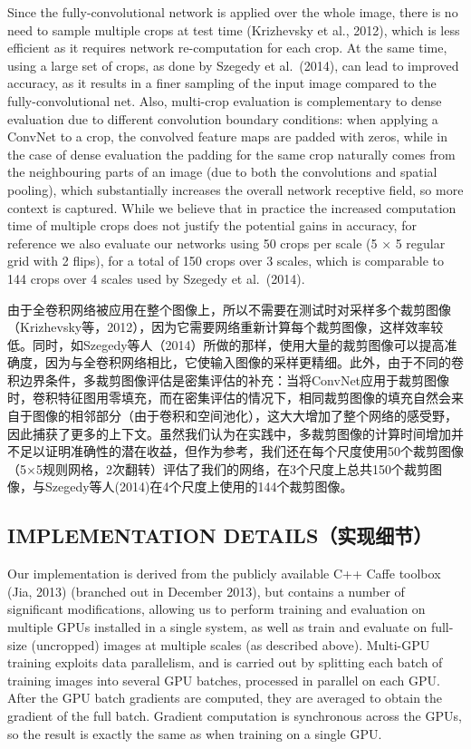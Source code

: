 \documentclass[12pt,a4paper,UTF8,twoside]{book}
\begin{document}
Since the fully-convolutional network is applied over the whole image, there is no need to sample multiple crops at test time (Krizhevsky et al., 2012), which is less efficient as it requires network re-computation for each crop. At the same time, using a large set of crops, as done by Szegedy et al.~(2014), can lead to improved accuracy, as it results in a finer sampling of the input image compared to the fully-convolutional net. Also, multi-crop evaluation is complementary to dense evaluation due to different convolution boundary conditions: when applying a ConvNet to a crop, the convolved feature maps are padded with zeros, while in the case of dense evaluation the padding for the same crop naturally comes from the neighbouring parts of an image (due to both the convolutions and spatial pooling), which substantially increases the overall network receptive field, so more context is captured. While we believe that in practice the increased computation time of multiple crops does not justify the potential gains in accuracy, for reference we also evaluate our networks using 50 crops per scale (5 × 5 regular grid with 2 flips), for a total of 150 crops over 3 scales, which is comparable to 144 crops over 4 scales used by Szegedy et al.~(2014).

由于全卷积网络被应用在整个图像上，所以不需要在测试时对采样多个裁剪图像（Krizhevsky等，2012），因为它需要网络重新计算每个裁剪图像，这样效率较低。同时，如Szegedy等人（2014）所做的那样，使用大量的裁剪图像可以提高准确度，因为与全卷积网络相比，它使输入图像的采样更精细。此外，由于不同的卷积边界条件，多裁剪图像评估是密集评估的补充：当将ConvNet应用于裁剪图像时，卷积特征图用零填充，而在密集评估的情况下，相同裁剪图像的填充自然会来自于图像的相邻部分（由于卷积和空间池化），这大大增加了整个网络的感受野，因此捕获了更多的上下文。虽然我们认为在实践中，多裁剪图像的计算时间增加并不足以证明准确性的潜在收益，但作为参考，我们还在每个尺度使用50个裁剪图像（5×5规则网格，2次翻转）评估了我们的网络，在3个尺度上总共150个裁剪图像，与Szegedy等人(2014)在4个尺度上使用的144个裁剪图像。

\hypertarget{implementation-detailsux5b9eux73b0ux7ec6ux8282}{%
\subsection{IMPLEMENTATION DETAILS（实现细节）}\label{implementation-detailsux5b9eux73b0ux7ec6ux8282}}

Our implementation is derived from the publicly available C++ Caffe toolbox (Jia, 2013) (branched out in December 2013), but contains a number of significant modifications, allowing us to perform training and evaluation on multiple GPUs installed in a single system, as well as train and evaluate on full-size (uncropped) images at multiple scales (as described above). Multi-GPU training exploits data parallelism, and is carried out by splitting each batch of training images into several GPU batches, processed in parallel on each GPU. After the GPU batch gradients are computed, they are averaged to obtain the gradient of the full batch. Gradient computation is synchronous across the GPUs, so the result is exactly the same as when training on a single GPU.
\end{document}
